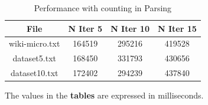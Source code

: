 \begin{table}[H]
\caption{Performance with counting in Parsing}
\centering
\begin{tabular}{c c c c}
\hline\hline
File & N Iter 5 & N Iter 10 & N Iter 15 \\ [0.7ex] %
\hline
wiki-micro.txt&164519&295216&419528\\
dataset5.txt&168450&331793&430656 \\
dataset10.txt&172402&294239&437840 \\ [1ex]
\hline
\end{tabular}
\label{table:nonlin}
\end{table}

\noindent The values in the \textbf{tables} are expressed in milliseconds.
